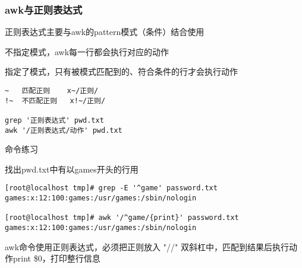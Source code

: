 \subsubsection{awk与正则表达式}
正则表达式主要与awk的pattern模式（条件）结合使用

不指定模式，awk每一行都会执行对应的动作

指定了模式，只有被模式匹配到的、符合条件的行才会执行动作

\begin{lstlisting}[style=linux]
~	匹配正则	x~/正则/
!~	不匹配正则	x!~/正则/

grep '正则表达式' pwd.txt
awk '/正则表达式/动作' pwd.txt
\end{lstlisting}

\begin{ascolorbox10}{命令练习}
	\begin{ascboxJ}{找出pwd.txt中有以games开头的行用}
		\begin{lstlisting}[style=linux]
[root@localhost tmp]# grep -E '^game' password.txt
games:x:12:100:games:/usr/games:/sbin/nologin

[root@localhost tmp]# awk '/^game/{print}' password.txt
games:x:12:100:games:/usr/games:/sbin/nologin
		\end{lstlisting}
	\end{ascboxJ}
\end{ascolorbox10}
awk命令使用正则表达式，必须把正则放入 "//" 双斜杠中，匹配到结果后执行动作{print \$0}，打印整行信息

